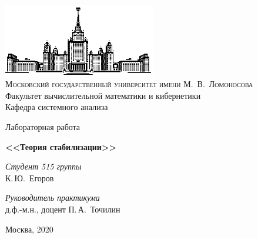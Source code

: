 \thispagestyle{empty}
\begin{center}
    \ \vspace{-3cm}

    \includegraphics[width=0.5\textwidth]{title_page/msu.eps}\\

    {\scshape Московский государственный университет имени М.~В.~Ломоносова}\\
    Факультет вычислительной математики и кибернетики\\
    Кафедра системного анализа

    \vfill

    {\LARGE Лабораторная работа}

    \vspace{1cm}
    {\Huge\bfseries <<Теория стабилизации>>}
\end{center}

\vspace{3cm}

\begin{flushright}
    \large
    \textit{Студент 515 группы}\\
    К.\,Ю.~Егоров

    \vspace{5mm}

    \textit{Руководитель практикума}\\
    д.ф.-м.н., доцент П.\,А.~Точилин
\end{flushright}

\vfill

\begin{center}
    Москва, 2020
\end{center}

\clearpage